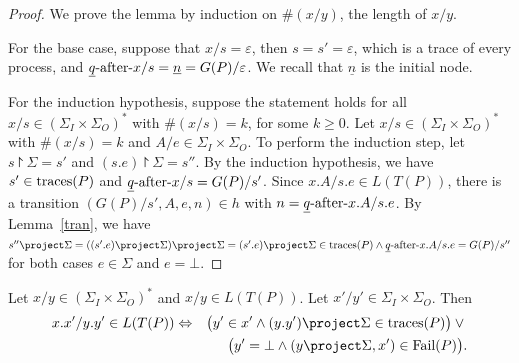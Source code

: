 \begin{proof}
  We prove the lemma by induction on $\#(x/y)$, the length of $x/y$.

  For the base case, suppose that $x/s = \varepsilon$, then $s = s' = \varepsilon$,
  which is a trace of every process, and $\underline q\text{-after-} x/s = \underline
  n = G(P)/{\varepsilon }$. We recall that $\underline n$ is the initial node.


  For the induction hypothesis, suppose the statement holds for all $x/s \in
  (\Sigma_I\times\Sigma_O)^*$ with $\#(x/s)=k$, for some $k\ge 0$. Let
  $x/s\in (\Sigma_I\times\Sigma_O)^*$ with $\#(x/s)=k$ and $A/e\in
  \Sigma_I\times \Sigma_O$. To perform the induction step, let $s\project
  \Sigma=s'$ and $(s.e) \project \Sigma=s''$. By the induction hypothesis, we
  have $s'\in\text{traces}(P)$ and $\underline q\text{-after-} x/s=G(P)/s'$. Since $x.A/s.e\in
  L(T(P))$, there is a transition $(G(P)/s',A,e,n)\in h$ with $n=\underline
  q\text{-after-} x.A/s.e$. By Lemma~\ref{tran}, we have
  $s''\project\Sigma=((s'.e)\project\Sigma) \project\Sigma =
  (s'.e)\project\Sigma\in \trc(P)\wedge \underline q\after x.A/s.e=G(P)/s''$
  for both cases $e\in\Sigma$ and $e=\bot$.

\end{proof}
%
%
\begin{lemma}\label{exte}
Let $x/y\in (\Sigma_I\times \Sigma_O)^*$ and $x/y\in L(T(P))$. Let $x'/y'\in \Sigma_I\times \Sigma_O$. Then
\begin{eqnarray*}
x.x'/y.y'\in L(T(P)) & \Leftrightarrow  &
\big(y'\in x'\wedge (y.y')\project \Sigma\in \trc(P)\big)\vee {}
\\ & & \big(y'=\bot\wedge (y\project \Sigma, x')\in {\text {\rm Fail}}(P)\big).
\end{eqnarray*}
\end{lemma}


